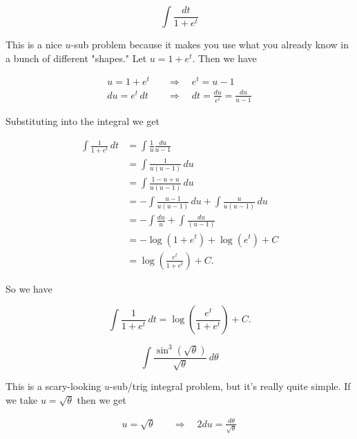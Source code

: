 \documentclass[12pt, letterpaper]{article}
\begin{document}
$$ \int \frac{dt}{1 + e^t} $$

This is a nice $u$-sub problem because it makes you use what you already know in a bunch of different "shapes." Let $u = 1 + e^t$. Then we have

\begin{equation*}
\begin{aligned}
u = 1 + e^t \quad &\Rightarrow \quad e^t = u - 1 \\
du = e^t \, dt \quad &\Rightarrow \quad dt = \frac{du}{e^t} = \frac{du}{u - 1}
\end{aligned}
\end{equation*}

Substituting into the integral we get

\begin{equation*}
\begin{aligned}
\int \frac{1}{1 + e^t} \, dt
  &= \int \frac{1}{u} \frac{du}{u - 1} \\[0.2in]
  &= \int \frac{1}{u(u-1)} \, du \\[0.2in]
  &= \int \frac{1 - u + u}{u(u-1)} \, du \\[0.2in]
  &= -\int \frac{u - 1}{u(u-1)} \, du + \int \frac{u}{u(u-1)} \, du  \\[0.2in]
  &= -\int \frac{du}{u} + \int \frac{du}{(u-1)}  \\[0.2in]
  &= -\log{\left( 1 + e^t \right)} + \log{\left( e^t  \right)} + C \\[0.2in]
  &= \log{\left( \frac{e^t}{1 + e^t} \right)} + C.
\end{aligned}
\end{equation*}

So we have

\begin{equation*}
\boxed
{
\int \frac{1}{1 + e^t} \, dt
  = \log{\left( \frac{e^t}{1 + e^t} \right)} + C.
}
\end{equation*}


\newpage

$$ \int \frac{\sin^3{\left( \sqrt{\theta} \right)}}{\sqrt{\theta}} \, d\theta $$

This is a scary-looking $u$-sub/trig integral problem, but it's really quite simple. If we take $u = \sqrt{\theta}$ then we get

\begin{equation*}
\begin{aligned}
u = \sqrt{\theta} \quad &\Rightarrow \quad 2 du = \frac{d\theta}{\sqrt{\theta}}
\end{aligned}
\end{equation*}
\end{document}
